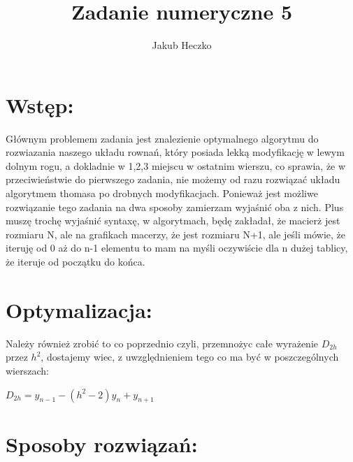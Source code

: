 \documentclass[12pt]{article}
\title{Zadanie numeryczne 5}
\author{Jakub Heczko}
\date{}
\begin{document}
\section{Wstęp:}
Głównym problemem zadania jest znalezienie optymalnego algorytmu do rozwiazania naszego układu rownań, który posiada lekką modyfikację w lewym dolnym rogu, a dokladnie w 1,2,3 miejscu w ostatnim wierszu, co sprawia, że w przeciwieństwie do pierwszego zadania, nie możemy od razu rozwiązać układu algorytmem thomasa po drobnych modyfikacjach. Ponieważ jest możliwe rozwiązanie tego zadania na dwa sposoby zamierzam wyjaśnić oba z nich. Plus muszę trochę wyjaśnić syntaxę, w algorytmach, będę zakładał, że macierż jest rozmiaru N, ale na grafikach macerzy, że jest rozmiaru N+1, ale jeśli mówie, że iteruję od 0 aż do n-1 elementu to mam na myśli oczywiście dla n dużej tablicy, że iteruje od początku do końca.
\section{Optymalizacja:}
Należy również zrobić to co poprzednio czyli, przemnożyc całe wyrażenie $D_{2h}$ przez $h^{2}$, dostajemy wiec, z uwzględnieniem tego co ma być w poszczególnych wierszach:
\newline
\begin{center}
    $D_{2h} = y_{n-1} - (h^{2} - 2)y_{n} + y_{n+1}$
\end{center}
\section{Sposoby rozwiązań:}
\end{document}
